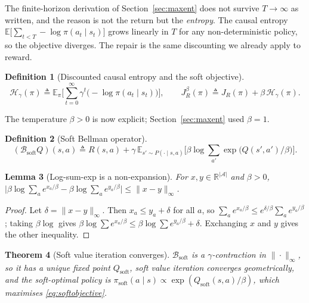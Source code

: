 \documentclass[11pt]{article}
\theoremstyle{plain}
\newtheorem{theorem}{Theorem}[section]
\newtheorem{lemma}[theorem]{Lemma}
\theoremstyle{definition}
\newtheorem{definition}[theorem]{Definition}
\theoremstyle{remark}
\newcommand{\A}{\mathcal{A}}
\newcommand{\E}{\mathbb{E}}
\newcommand{\R}{\mathbb{R}}
\newcommand{\soft}{\mathrm{soft}}
\begin{document}
The finite-horizon derivation of Section~\ref{sec:maxent} does not survive
$T\to\infty$ as written, and the reason is not the return but the
\emph{entropy}. The causal entropy $\E\big[\sum_{t<T}-\log\pi(a_t\mid
s_t)\big]$ grows linearly in $T$ for any non-deterministic policy, so the
objective diverges. The repair is the same discounting we already apply to
reward.

\begin{definition}[Discounted causal entropy and the soft objective]
\begin{equation}
\mathcal{H}_\gamma(\pi) \triangleq \E_\pi\Big[\sum_{t=0}^\infty \gamma^t
\big(-\log\pi(a_t\mid s_t)\big)\Big], \qquad
J_R^\beta(\pi) \triangleq J_R(\pi) + \beta\,\mathcal{H}_\gamma(\pi).
\label{eq:softobjective}
\end{equation}
\end{definition}

The temperature $\beta>0$ is now explicit; Section~\ref{sec:maxent} used
$\beta=1$.

\begin{definition}[Soft Bellman operator]
\begin{equation}
(\mathcal{B}_\soft Q)(s,a) \triangleq R(s,a) + \gamma\,\E_{s'\sim P(\cdot\mid
s,a)}\Big[\beta\log\sum_{a'}\exp\big(Q(s',a')/\beta\big)\Big].
\label{eq:softbellman}
\end{equation}
\end{definition}

\begin{lemma}[Log-sum-exp is a non-expansion]\label{lem:lse}
For $x,y\in\R^{|\A|}$ and $\beta>0$, $\big|\beta\log\sum_a e^{x_a/\beta} -
\beta\log\sum_a e^{y_a/\beta}\big| \le \|x-y\|_\infty$.
\end{lemma}

\begin{proof}
Let $\delta=\|x-y\|_\infty$. Then $x_a\le y_a+\delta$ for all $a$, so
$\sum_a e^{x_a/\beta}\le e^{\delta/\beta}\sum_a e^{y_a/\beta}$; taking
$\beta\log$ gives $\beta\log\sum e^{x_a/\beta} \le \beta\log\sum
e^{y_a/\beta} + \delta$. Exchanging $x$ and $y$ gives the other
inequality.
\end{proof}

\begin{theorem}[Soft value iteration converges]
$\mathcal{B}_\soft$ is a $\gamma$-contraction in $\|\cdot\|_\infty$, so it
has a unique fixed point $Q_\soft$, soft value iteration converges
geometrically, and the soft-optimal policy is $\pi_\soft(a\mid s)\propto
\exp(Q_\soft(s,a)/\beta)$, which maximises \eqref{eq:softobjective}.
\end{theorem}
\end{document}
